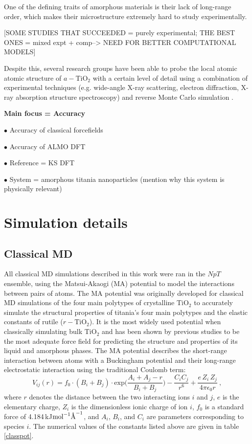 \documentclass[aps,prb,twocolumn,amsmath,amssymb,superscriptaddress,longbibliography]{revtex4-1}
\newcommand{\angstrom}{\text{\normalfont\AA}}
\newcommand\tab[1][1cm]{\hspace*{#1}} %
\begin{document}
\tab One of the defining traits of amorphous materials is their lack of long-range order, which makes their microstructure extremely hard to study experimentally.

[SOME STUDIES THAT SUCCEEDED = purely experimental; THE BEST ONES = mixed expt + comp--> NEED FOR BETTER COMPUTATIONAL MODELS]

Despite this, several research groups have been able to probe the local atomic atomic structure of $a-\text{TiO}_2$ with a certain level of detail using a combination of experimental techniques (e.g. wide-angle X-ray scattering, electron diffraction, X-ray absorption structure spectroscopy) and reverse Monte Carlo simulation \cite{exptl1,exptl2}.




\textbf{Main focus = Accuracy}

$\bullet$ Accuracy of classical forcefields

$\bullet$ Accuracy of ALMO DFT

$\bullet$ Reference = KS DFT

$\bullet$ System = amorphous titania nanoparticles (mention why this system is physically relevant)

\section*{Simulation details}

\subsection{Classical MD}

\tab All classical MD simulations described in this work were ran in the $NpT$ ensemble, using the Matsui-Akaogi (MA) potential to model the interactions between pairs of atoms.
The MA potential was originally developed for classical MD simulations of the four main polytypes of crystalline $\text{TiO}_2$\cite{MA_og} to accurately simulate the structural properties of titania's four main polytypes and the elastic constants of rutile ($r-\text{TiO}_2$). 
It is the most widely used potential when classically simulating bulk $\text{TiO}_2$ and has been shown by previous studies\cite{smith_collins,fichtorn,vvh2007} to be the most adequate force field for predicting the structure and properties of its liquid and amorphous phases.
The MA potential describes the short-range interaction between atoms with a Buckingham potential and their long-range electrostatic interaction using the traditional Coulomb term:
\begin{equation}
V_{ij}(r) = f_{0}\cdot (B_i+B_j)\cdot\text{exp}\big(\frac{A_i + A_j - r}{B_i + B_j}\big) - \frac{C_{i}C_j}{r^6} + \frac{e\,Z_i\,Z_j}{4\pi\epsilon_0 r}\: ,
\end{equation}
where $r$ denotes the distance between the two interacting ions $i$ and $j$, $e$ is the elementary charge, $Z_i$ is the dimensionless ionic charge of ion $i$, $f_0$ is a standard force of 4.184$\,$kJ$\text{mol}^{-1}\angstrom^{-1}$, and $A_i$, $B_i$, and $C_i$ are parameters corresponding to species $i$.
The numerical values of the constants listed above are given in table \ref{classpot}.
\end{document}
